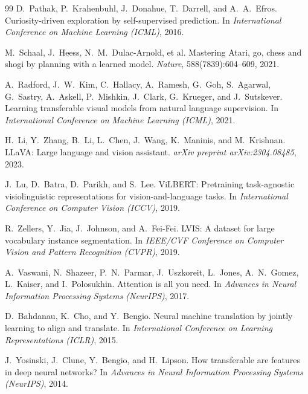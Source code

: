 \documentclass[12pt,a4paper,openany]{report}
\begin{document}
\begin{thebibliography}{99}
 D.~Pathak, P.~Krahenbuhl, J.~Donahue, T.~Darrell, and A.~A.~Efros. Curiosity-driven exploration by self-supervised prediction. In \textit{International Conference on Machine Learning (ICML)}, 2016.

 M.~Schaal, J.~Heess, N.~M.~Dulac-Arnold, et al. Mastering Atari, go, chess and shogi by planning with a learned model. \textit{Nature}, 588(7839):604--609, 2021.


 A.~Radford, J.~W.~Kim, C.~Hallacy, A.~Ramesh, G.~Goh, S.~Agarwal, G.~Sastry, A.~Askell, P.~Mishkin, J.~Clark, G.~Krueger, and J.~Sutskever. Learning transferable visual models from natural language supervision. In \textit{International Conference on Machine Learning (ICML)}, 2021.

 H.~Li, Y.~Zhang, B.~Li, L.~Chen, J.~Wang, K.~Maninis, and M.~Krishnan. LLaVA: Large language and vision assistant. \textit{arXiv preprint arXiv:2304.08485}, 2023.

 J.~Lu, D.~Batra, D.~Parikh, and S.~Lee. ViLBERT: Pretraining task-agnostic visiolinguistic representations for vision-and-language tasks. In \textit{International Conference on Computer Vision (ICCV)}, 2019.

 R.~Zellers, Y.~Jia, J.~Johnson, and A.~Fei-Fei. LVIS: A dataset for large vocabulary instance segmentation. In \textit{IEEE/CVF Conference on Computer Vision and Pattern Recognition (CVPR)}, 2019.


 A.~Vaswani, N.~Shazeer, P.~N.~Parmar, J.~Uszkoreit, L.~Jones, A.~N.~Gomez, L.~Kaiser, and I.~Polosukhin. Attention is all you need. In \textit{Advances in Neural Information Processing Systems (NeurIPS)}, 2017.

 D.~Bahdanau, K.~Cho, and Y.~Bengio. Neural machine translation by jointly learning to align and translate. In \textit{International Conference on Learning Representations (ICLR)}, 2015.


 J.~Yosinski, J.~Clune, Y.~Bengio, and H.~Lipson. How transferable are features in deep neural networks? In \textit{Advances in Neural Information Processing Systems (NeurIPS)}, 2014.


\end{thebibliography}
\end{document}
